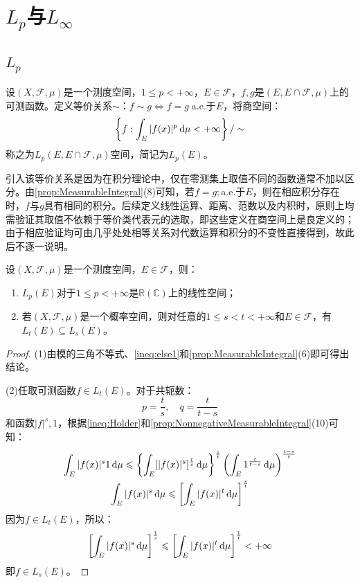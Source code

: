 \section{$L_p$与$L_{\infty}$}

\subsection{$L_p$}
\begin{definition}
	设$(X,\mathscr{F},\mu)$是一个测度空间，$1\leqslant p<+\infty$，$E\in\mathscr{F}$，$f,g$是$(E,E\cap\mathscr{F},\mu)$上的可测函数。定义等价关系$\sim$：$f\sim g\Leftrightarrow f=g\;$a.e.于$E$，将商空间：
	\begin{equation*}
		\left\{f:\int_{E}|f(x)|^p\mathop{}\!\mathrm{d}\mu<+\infty\right\}/\sim
	\end{equation*}
	称之为$L_p(E,E\cap\mathscr{F},\mu)$空间，简记为$L_p(E)$。
\end{definition}
\begin{note}
	引入该等价关系是因为在积分理论中，仅在零测集上取值不同的函数通常不加以区分。由\cref{prop:MeasurableIntegral}(8)可知，若$f=g;$a.e.于$E$，则在相应积分存在时，$f$与$g$具有相同的积分。后续定义线性运算、距离、范数以及内积时，原则上均需验证其取值不依赖于等价类代表元的选取，即这些定义在商空间上是良定义的；由于相应验证均可由几乎处处相等关系对代数运算和积分的不变性直接得到，故此后不逐一说明。
\end{note}
\begin{property}\label{prop:Lp}
	设$(X,\mathscr{F},\mu)$是一个测度空间，$E\in\mathscr{F}$，则：
	\begin{enumerate}
		\item $L_p(E)$对于$1\leqslant p<+\infty$是$\mathbb{R}(\mathbb{C})$上的线性空间；
		\item 若$(X,\mathscr{F},\mu)$是一个概率空间，则对任意的$1\leqslant s<t<+\infty$和$E\in\mathscr{F}$，有$L_t(E)\subseteq L_s(E)$。
	\end{enumerate}
\end{property}
\begin{proof}
	(1)由模的三角不等式、\cref{ineq:else1}和\cref{prop:MeasurableIntegral}(6)即可得出结论。\par
	(2)任取可测函数$f\in L_t(E)$。对于共轭数：
	\begin{equation*}
		p=\frac{t}{s},\quad q=\frac{t}{t-s}
	\end{equation*}
	和函数$|f|^s,1$，根据\cref{ineq:Holder}和\cref{prop:NonnegativeMeasurableIntegral}(10)可知：
	\begin{gather*}
		\int_{E}|f(x)|^s1\mathop{}\!\mathrm{d}\mu\leqslant\left\{\int_{E}[|f(x)|^s]^{\frac{t}{s}}\mathop{}\!\mathrm{d}\mu\right\}^{\frac{s}{t}}\left(\int_{E}1^{\frac{t}{t-s}}\mathop{}\!\mathrm{d}\mu\right)^{\frac{t-s}{t}} \\
		\int_{E}|f(x)|^s\mathop{}\!\mathrm{d}\mu\leqslant\left[\int_{E}|f(x)|^t\mathop{}\!\mathrm{d}\mu\right]^{\frac{s}{t}}
	\end{gather*}
	因为$f\in L_t(E)$，所以：
	\begin{equation*}
		\left[\int_{E}|f(x)|^s\mathop{}\!\mathrm{d}\mu\right]^{\frac{1}{s}}\leqslant\left[\int_{E}|f(x)|^t\mathop{}\!\mathrm{d}\mu\right]^{\frac{1}{t}}<+\infty
	\end{equation*}
	即$f\in L_s(E)$。
\end{proof}
